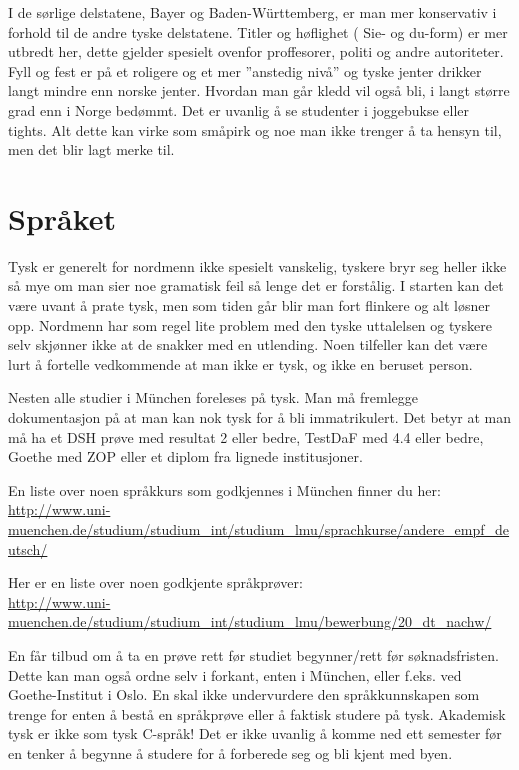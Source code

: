 I de sørlige delstatene, Bayer og Baden-Württemberg, er man mer konservativ i forhold til de andre tyske delstatene. Titler og høflighet ( Sie- og du-form) er mer utbredt her, dette gjelder spesielt ovenfor proffesorer, politi og andre autoriteter.
Fyll og fest er på et roligere og et mer ''anstedig nivå'' og tyske jenter drikker langt mindre enn norske jenter. Hvordan man går kledd vil også bli, i langt større grad enn i Norge bedømmt. Det er uvanlig å se studenter i joggebukse eller tights. 
Alt dette kan virke som småpirk og noe man ikke trenger å ta hensyn til, men det blir lagt merke til. 



\section{Språket}
Tysk er generelt for nordmenn ikke spesielt vanskelig, tyskere bryr seg heller ikke så mye om man sier noe gramatisk feil så lenge det er forstålig. I starten kan det være uvant å prate tysk, men som tiden går blir man fort flinkere og alt løsner opp. Nordmenn har som regel lite problem med den tyske uttalelsen og tyskere selv skjønner ikke at de snakker med en utlending. Noen tilfeller kan det være lurt å fortelle vedkommende at man ikke er tysk, og ikke en beruset person.

Nesten alle studier i München foreleses på tysk.
Man må fremlegge dokumentasjon på at man kan nok tysk for å bli immatrikulert.
Det betyr at man må ha et DSH prøve med resultat 2 eller bedre, TestDaF med 4.4 eller bedre, Goethe med ZOP eller et diplom fra lignede institusjoner. 

En liste over noen språkkurs som godkjennes i München finner du her:\\
\url{http://www.uni-muenchen.de/studium/studium_int/studium_lmu/sprachkurse/andere_empf_deutsch/}


Her er en liste over noen godkjente språkprøver:\\
\url{http://www.uni-muenchen.de/studium/studium_int/studium_lmu/bewerbung/20_dt_nachw/}

En får tilbud om å ta en prøve rett før studiet begynner/rett før søknadsfristen. Dette kan man også ordne selv i forkant, enten i München, eller f.eks. ved Goethe-Institut i Oslo.
En skal ikke undervurdere den språkkunnskapen som trenge for enten å bestå en språkprøve eller å faktisk studere på tysk. Akademisk tysk er ikke som tysk C-språk!
  Det er ikke uvanlig å komme ned ett semester før en tenker å begynne å studere for å forberede seg og bli kjent med byen.

